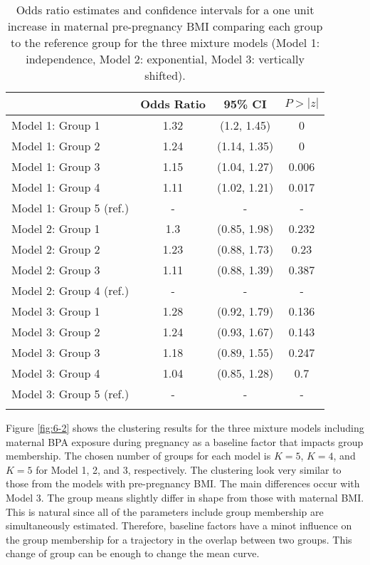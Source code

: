\begin{table}[ht]
\begin{center}
\begin{tabular}{lccc}
  \thickhline
 & Odds Ratio & 95\% CI& $P>|z|$ \\ 
  \hline
Model 1: Group  1 & 1.32 & (1.2, 1.45) & 0 \\ 
  Model 1: Group  2 & 1.24 & (1.14, 1.35) & 0 \\ 
  Model 1: Group  3 & 1.15 & (1.04, 1.27) & 0.006 \\ 
  Model 1: Group  4 & 1.11 & (1.02, 1.21) & 0.017 \\ 
  Model 1: Group  5  (ref.) & - & - & - \\ 
  Model 2: Group  1 & 1.3 & (0.85, 1.98) & 0.232 \\ 
  Model 2: Group  2 & 1.23 & (0.88, 1.73) & 0.23 \\ 
  Model 2: Group  3 & 1.11 & (0.88, 1.39) & 0.387 \\ 
  Model 2: Group  4  (ref.) & - & - & - \\ 
  Model 3: Group  1 & 1.28 & (0.92, 1.79) & 0.136 \\ 
  Model 3: Group  2 & 1.24 & (0.93, 1.67) & 0.143 \\ 
  Model 3: Group  3 & 1.18 & (0.89, 1.55) & 0.247 \\ 
  Model 3: Group  4 & 1.04 & (0.85, 1.28) & 0.7 \\ 
  Model 3: Group  5  (ref.) & - & - & - \\ 
   \thickhline
\end{tabular}
\caption{Odds ratio estimates and confidence intervals for a one unit increase in maternal pre-pregnancy BMI comparing each group to the reference group for the three mixture models (Model 1: independence, Model 2: exponential, Model 3: vertically shifted). }
\end{center}
\label{tab:6-1}
\end{table}

Figure \ref{fig:6-2} shows the clustering results for the three mixture models including maternal BPA exposure during pregnancy as a baseline factor that impacts group membership. The chosen number of groups for each model is $K = 5$, $K=4$, and $K=5$ for Model 1, 2, and 3, respectively. The clustering look very similar to those from the models with pre-pregnancy BMI. The main differences occur with Model 3. The group means slightly differ in shape from those with maternal BMI. This is natural since all of the parameters include group membership are simultaneously estimated. Therefore, baseline factors have a minot influence on the group membership for a trajectory in the overlap between two groups. This change of group can be enough to change the mean curve.

